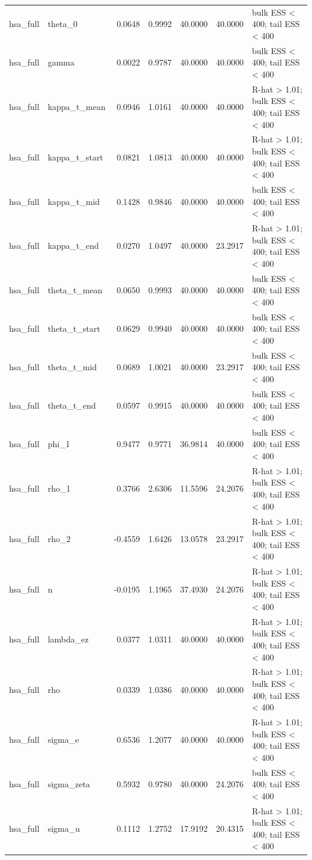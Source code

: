 \begin{tabular}{llrrrrl}
hsa\_full & theta\_0 & 0.0648 & 0.9992 & 40.0000 & 40.0000 & bulk ESS < 400; tail ESS < 400 \\
hsa\_full & gamma & 0.0022 & 0.9787 & 40.0000 & 40.0000 & bulk ESS < 400; tail ESS < 400 \\
hsa\_full & kappa\_t\_mean & 0.0946 & 1.0161 & 40.0000 & 40.0000 & R-hat > 1.01; bulk ESS < 400; tail ESS < 400 \\
hsa\_full & kappa\_t\_start & 0.0821 & 1.0813 & 40.0000 & 40.0000 & R-hat > 1.01; bulk ESS < 400; tail ESS < 400 \\
hsa\_full & kappa\_t\_mid & 0.1428 & 0.9846 & 40.0000 & 40.0000 & bulk ESS < 400; tail ESS < 400 \\
hsa\_full & kappa\_t\_end & 0.0270 & 1.0497 & 40.0000 & 23.2917 & R-hat > 1.01; bulk ESS < 400; tail ESS < 400 \\
hsa\_full & theta\_t\_mean & 0.0650 & 0.9993 & 40.0000 & 40.0000 & bulk ESS < 400; tail ESS < 400 \\
hsa\_full & theta\_t\_start & 0.0629 & 0.9940 & 40.0000 & 40.0000 & bulk ESS < 400; tail ESS < 400 \\
hsa\_full & theta\_t\_mid & 0.0689 & 1.0021 & 40.0000 & 23.2917 & bulk ESS < 400; tail ESS < 400 \\
hsa\_full & theta\_t\_end & 0.0597 & 0.9915 & 40.0000 & 40.0000 & bulk ESS < 400; tail ESS < 400 \\
hsa\_full & phi\_1 & 0.9477 & 0.9771 & 36.9814 & 40.0000 & bulk ESS < 400; tail ESS < 400 \\
hsa\_full & rho\_1 & 0.3766 & 2.6306 & 11.5596 & 24.2076 & R-hat > 1.01; bulk ESS < 400; tail ESS < 400 \\
hsa\_full & rho\_2 & -0.4559 & 1.6426 & 13.0578 & 23.2917 & R-hat > 1.01; bulk ESS < 400; tail ESS < 400 \\
hsa\_full & n & -0.0195 & 1.1965 & 37.4930 & 24.2076 & R-hat > 1.01; bulk ESS < 400; tail ESS < 400 \\
hsa\_full & lambda\_ez & 0.0377 & 1.0311 & 40.0000 & 40.0000 & R-hat > 1.01; bulk ESS < 400; tail ESS < 400 \\
hsa\_full & rho & 0.0339 & 1.0386 & 40.0000 & 40.0000 & R-hat > 1.01; bulk ESS < 400; tail ESS < 400 \\
hsa\_full & sigma\_e & 0.6536 & 1.2077 & 40.0000 & 40.0000 & R-hat > 1.01; bulk ESS < 400; tail ESS < 400 \\
hsa\_full & sigma\_zeta & 0.5932 & 0.9780 & 40.0000 & 24.2076 & bulk ESS < 400; tail ESS < 400 \\
hsa\_full & sigma\_u & 0.1112 & 1.2752 & 17.9192 & 20.4315 & R-hat > 1.01; bulk ESS < 400; tail ESS < 400 \\

\end{tabular}
